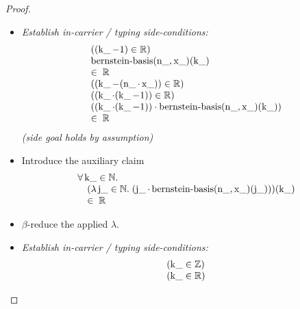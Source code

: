 \documentclass[11pt]{article}
\theoremstyle{plain}
\begin{document}
\begin{proof}
\begin{itemize}[leftmargin=2.8em, itemsep=4pt, parsep=1pt]
  \item[\textbf{24--29}] \emph{Establish in-carrier / typing side-conditions:}
\begin{equation*}
\begin{array}{@{}l@{}}
((\operatorname{k\_} - 1) \in \mathbb{R}) \\
\begin{array}{@{}l@{}} \operatorname{bernstein\text{-}basis}(\operatorname{n\_}, \operatorname{x\_})(\operatorname{k\_}) \\ \in\; \mathbb{R} \end{array} \\
((\operatorname{k\_} - (\operatorname{n\_} \cdot \operatorname{x\_})) \in \mathbb{R}) \\
((\operatorname{k\_} \cdot (\operatorname{k\_} - 1)) \in \mathbb{R}) \\
\begin{array}{@{}l@{}} ((\operatorname{k\_} \cdot (\operatorname{k\_} - 1)) \cdot \operatorname{bernstein\text{-}basis}(\operatorname{n\_}, \operatorname{x\_})(\operatorname{k\_})) \\ \in\; \mathbb{R} \end{array}
\end{array}
\end{equation*}
  \emph{(side goal holds by assumption)}
  \item[\textbf{30}] Introduce the auxiliary claim
\begin{equation*}
\begin{array}{@{}l@{}} \forall \operatorname{k\_} \in \mathbb{N}. \\ \quad (\lambda \operatorname{j\_} \in \mathbb{N}.\; (\operatorname{j\_} \cdot \operatorname{bernstein\text{-}basis}(\operatorname{n\_}, \operatorname{x\_})(\operatorname{j\_})))(\operatorname{k\_}) \\ \quad \in\; \mathbb{R} \end{array}
\end{equation*}

  \item[\textbf{31--32}] $\beta$-reduce the applied $\lambda$.
  \item[\textbf{33--34}] \emph{Establish in-carrier / typing side-conditions:}
\begin{equation*}
\begin{array}{@{}l@{}}
(\operatorname{k\_} \in \mathbb{Z}) \\
(\operatorname{k\_} \in \mathbb{R})
\end{array}
\end{equation*}


\end{itemize}
\end{proof}
\end{document}
